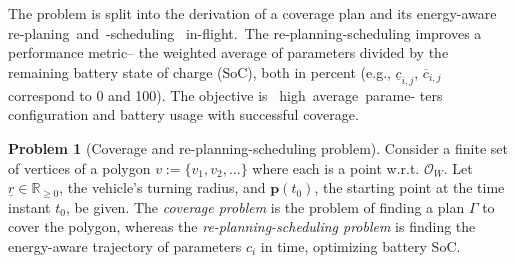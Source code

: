 \documentclass[letterpaper,10pt,journal,twoside]{IEEEtran}
\theoremstyle{definition}
\newtheorem*{pb}{Problem}%
\begin{document}
The problem %
is {\color{blue}split into }%
{\color{blue}the derivation }%
{\color{blue} of} a {\color{blue}coverage} plan %
{\color{blue}and its} {\color{blue}energy-aware} %
re-plan{\color{blue}ing}~and~-schedul{\color{blue}ing~}%
in-flight.~The %
{\color{blue} 
re-planning-scheduling improves a performance metric--%
the weighted average of parameters divided by the remaining battery state of charge (SoC), both in percent (e.g., $\underline{c}_{i,j}$, $\overline{c}_{i,j}$ correspond to 0 and 100). The objective is~%
high~average~parame- ters configuration and battery usage with successful %
coverage.
}\vspace*{-2.7ex}

\begin{pb}[Coverage and re-planning-scheduling problem]
  \label{pb:cov-pb}
  Consider a finite set of vertices of a polygon $v:=\{v_1,v_2,\dots\}$ where each %
  is a point w.r.t. $\mathcal{O}_W$. 
  Let $\underline{r}\in\mathbb{R}_{\geq 0}$, the vehicle's turning radius, and $\mathbf{p}(t_0)$, the starting point at the time instant $t_0$, be given. 
  The \emph{coverage problem} is the problem of finding a plan $\Gamma$ to cover the polygon, whereas the \emph{re-planning-scheduling problem} is finding the {\color{blue}energy-aware} trajectory of parameters $c_i$ in time{\color{blue}, optimizing battery SoC}.
\end{pb}    


\end{document}

